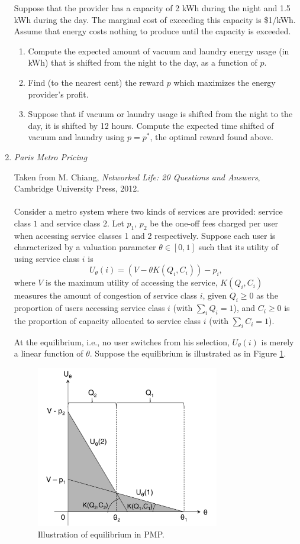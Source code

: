 \begin{enumerate}
Suppose that the provider has a capacity of 2 kWh during the night and 1.5 kWh during the day.  The marginal cost of exceeding this capacity is \$1/kWh.  Assume that energy costs nothing to produce until the capacity is exceeded.

\begin{enumerate}
\item
Compute the expected amount of vacuum and laundry energy usage (in kWh) that is shifted from the night to the day, as a function of $p$.
\item
Find (to the nearest cent) the reward $p$ which maximizes the energy provider's profit.
\item
Suppose that if vacuum or laundry usage is shifted from the night to the day, it is shifted by 12 hours.  Compute the expected time shifted of vacuum and laundry using $p = p^\ast$, the optimal reward found above.
\end{enumerate}

\item \emph{Paris Metro Pricing}

Taken from M. Chiang, \emph{Networked Life: 20 Questions and Answers}, Cambridge University Press, 2012.
\\ \\
Consider a metro system where two kinds of services are provided: service class $1$ and service class $2$. Let $p_1$, $p_2$ be the one-off fees charged per user when accessing service classes 1 and 2 respectively. Suppose each user is characterized by a valuation parameter $\theta\in [0,1]$ such that its utility of using service class $i$ is
$$U_{\theta}(i)=(V-\theta K(Q_i,C_i))-p_{i},$$
where $V$ is the maximum utility of accessing the service, $K(Q_i,C_i)$ measures the amount of congestion of service class $i$, given $Q_i\geq 0$ as the proportion of users accessing service class $i$ (with $\sum_i Q_i=1$), and $C_i\geq0$ is the proportion of capacity allocated to service class $i$ (with $\sum_i C_i=1$).

At the equilibrium, i.e., no user switches from his selection, $U_{\theta}(i)$ is merely a linear function of $\theta$. Suppose the equilibrium is illustrated as in Figure \ref{fig:equilibrium}.\\

\begin{figure}
\centering
\includegraphics[width=8cm]{Figures/Equilibrium.pdf} 
\caption{\label{fig:equilibrium}Illustration of equilibrium in PMP.}
\end{figure}


\end{enumerate}
